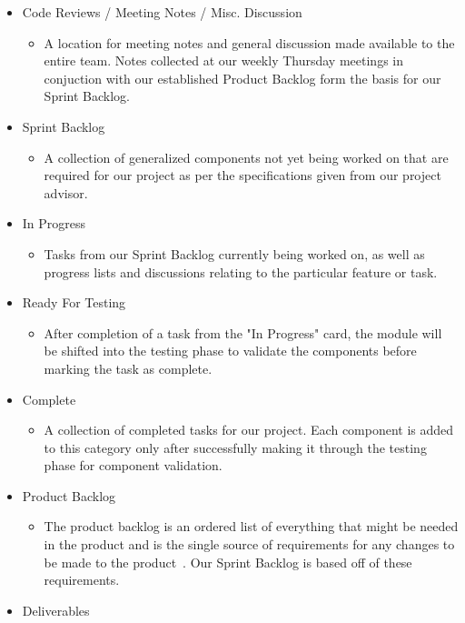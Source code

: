 \begin{itemize}
	\item Code Reviews / Meeting Notes / Misc. Discussion
	\begin{itemize}
		\item[] A location for meeting notes and general discussion made available to the entire team. Notes collected at our weekly Thursday meetings in conjuction with our established Product Backlog form the basis for our Sprint Backlog.
	\end{itemize}
	\item Sprint Backlog
	\begin{itemize}
		\item[] A collection of generalized components not yet being worked on that are required for our project as per the specifications given from our project advisor.
	\end{itemize}
	\item In Progress
	\begin{itemize}
		\item[] Tasks from our Sprint Backlog currently being worked on, as well as progress lists and discussions relating to the particular feature or task.
	\end{itemize}
	\item Ready For Testing
	\begin{itemize}
		\item[] After completion of a task from the "In Progress" card, the module will be shifted into the testing phase to validate the components before marking the task as complete.
	\end{itemize}
	\item Complete
	\begin{itemize}
		\item[] A collection of completed tasks for our project. Each component is added to this category only after successfully making it through the testing phase for component validation.
	\end{itemize}
	\item Product Backlog
	\begin{itemize}
		\item[] The product backlog is an ordered list of everything that might be needed in the product and is the single source of requirements for any changes to be made to the product~\cite{ScrumGuide}. Our Sprint Backlog is based off of these requirements.
	\end{itemize}
	\item Deliverables

\end{itemize}
